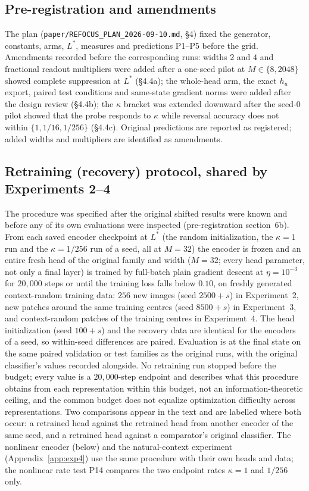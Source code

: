 \subsection{Pre-registration and amendments}
The plan (\texttt{paper/REFOCUS\_PLAN\_2026-09-10.md}, \S4) fixed the
generator, constants, arms, $L^\ast$, measures and predictions P1--P5 before
the grid. Amendments recorded before the corresponding runs: widths $2$ and
$4$ and fractional readout multipliers were added after a one-seed pilot at
$M\in\{8,2048\}$ showed complete suppression at $L^\ast$ (\S4.4a); the
whole-head arm, the exact $h_u$ export, paired test conditions and
same-state gradient norms were added after the design review (\S4.4b); the
$\kappa$ bracket was extended downward after the seed-0 pilot showed that
the probe responds to $\kappa$ while reversal accuracy does not within
$\{1,1/16,1/256\}$ (\S4.4c). Original predictions are reported as
registered; added widths and multipliers are identified as amendments.

\subsection{Retraining (recovery) protocol, shared by Experiments 2--4}
The procedure was specified after the original shifted results were known and before
any of its own evaluations were inspected (pre-registration section~6b). From each
saved encoder checkpoint at $L^\ast$ (the random initialization, the $\kappa=1$ run and
the $\kappa=1/256$ run of a seed, all at $M=32$) the encoder is frozen and an entire
fresh head of the original family and width ($M=32$; every head parameter, not only a
final layer) is trained by full-batch plain gradient descent at $\eta=10^{-3}$ for
$20{,}000$ steps or until the training loss falls below $0.10$, on freshly generated
context-random training data: $256$ new images (seed $2500+s$) in Experiment~2, new
patches around the same training centres (seed $8500+s$) in Experiment~3, and
context-random patches of the training centres in Experiment~4. The head
initialization (seed $100+s$) and the recovery data are identical for the encoders of
a seed, so within-seed differences are paired. Evaluation is at the final state on the
same paired validation or test families as the original runs, with the original
classifier's values recorded alongside. No retraining run stopped before the budget;
every value is a $20{,}000$-step endpoint and describes what this procedure obtains from
each representation within this budget, not an information-theoretic ceiling, and the
common budget does not equalize optimization difficulty across representations. Two
comparisons appear in the text and are labelled where both occur: a retrained head
against the retrained head from another encoder of the same seed, and a retrained head
against a comparator's original classifier. The nonlinear encoder (below) and the
natural-context experiment (Appendix~\ref{app:exp4}) use the same procedure with their
own heads and data; the nonlinear rate test P14 compares the two endpoint rates
$\kappa=1$ and $1/256$ only.

